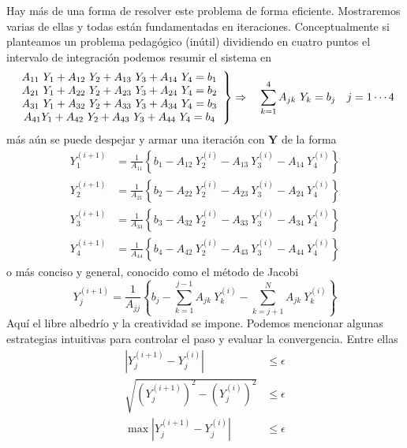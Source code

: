 \documentclass[spanish,titlepage,11pt]{article}
\begin{document}
Hay m\'{a}s de una forma de resolver este problema de forma eficiente.
Mostraremos varias de ellas y todas est\'{a}n fundamentadas en iteraciones.
Conceptualmente si planteamos un problema pedag\'{o}gico (in\'{u}til)
dividiendo en cuatro puntos el intervalo de integraci\'{o}n podemos resumir el
sistema en
\[
\left.
\begin{array}
[c]{c}%
A_{11}\ Y_{1}+A_{12}\ Y_{2}+A_{13}\ Y_{3}+A_{14}\ Y_{4}=b_{1}\\
A_{21}\ Y_{1}+A_{22}\ Y_{2}+A_{23}\ Y_{3}+A_{24}\ Y_{4}=b_{2}\\
A_{31}\ Y_{1}+A_{32}\ Y_{2}+A_{33}\ Y_{3}+A_{34}\ Y_{4}=b_{3}\\
A_{41}Y_{1}+A_{42}\ Y_{2}+A_{43}\ Y_{3}+A_{44}\ Y_{4}=b_{4}%
\end{array}
\right\}  \Rightarrow\quad\sum_{k=1}^{4}A_{jk}\ Y_{k}=b_{j}\quad j=1\cdots4
\]
m\'{a}s a\'{u}n se puede despejar y armar una iteraci\'{o}n con $\mathbf{Y}$
de la forma
\begin{align*}
Y_{1}^{(i+1)}  &  =\frac{1}{A_{11}}\left\{  b_{1}-A_{12}\ Y_{2}^{\left(
i\right)  }-A_{13}\ Y_{3}^{\left(  i\right)  }-A_{14}\ Y_{4}^{\left(
i\right)  }\right\} \\
Y_{2}^{(i+1)}  &  =\frac{1}{A_{21}}\left\{  b_{2}-A_{22}\ Y_{2}^{\left(
i\right)  }-A_{23}\ Y_{3}^{\left(  i\right)  }-A_{24}\ Y_{4}^{\left(
i\right)  }\right\} \\
Y_{3}^{(i+1)}  &  =\frac{1}{A_{33}}\left\{  b_{3}-A_{32}\ Y_{2}^{\left(
i\right)  }-A_{33}\ Y_{3}^{\left(  i\right)  }-A_{34}\ Y_{4}^{\left(
i\right)  }\right\} \\
Y_{4}^{(i+1)}  &  =\frac{1}{A_{44}}\left\{  b_{4}-A_{42}\ Y_{2}^{\left(
i\right)  }-A_{43}\ Y_{3}^{\left(  i\right)  }-A_{44}\ Y_{4}^{\left(
i\right)  }\right\}
\end{align*}
o m\'{a}s conciso y general, conocido como el m\'{e}todo de Jacobi
\[
Y_{j}^{(i+1)}=\frac{1}{A_{jj}}\left\{  b_{j}-\sum_{k=1}^{j-1}A_{jk}%
\ Y_{k}^{\left(  i\right)  }-\sum_{k=j+1}^{N}A_{jk}\ Y_{k}^{\left(  i\right)
}\right\}
\]
Aqu\'{i} el libre albedr\'{i}o y la creatividad se impone. Podemos mencionar
algunas estrategias intuitivas para controlar el paso y evaluar la
convergencia. Entre ellas
\begin{align*}
\left|  Y_{j}^{(i+1)}-Y_{j}^{(i)}\right|   &  \leq\epsilon\\
\sqrt{\left(  Y_{j}^{(i+1)}\right)  ^{2}-\left(  Y_{j}^{(i)}\right)  ^{2}}  &
\leq\epsilon\\
\max\left|  Y_{j}^{(i+1)}-Y_{j}^{(i)}\right|   &  \leq\epsilon
\end{align*}
\end{document}
